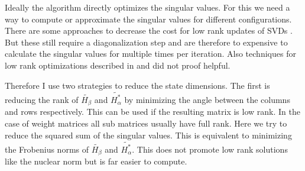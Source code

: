 \documentclass[doctype=mastersthesis,BCOR=15mm,biblatex]{ldvbook}%
\begin{document}
Ideally the algorithm directly optimizes the singular values.
For this we need a way to compute or approximate the singular values for different configurations. 
There are some approaches to decrease the cost for low rank updates of SVDs \cite{brand_fast_2006}.
But these still require a diagonalization step and are therefore to expensive to calculate the singular values for multiple times per iteration.
Also techniques for low rank optimizations described in \cite{liu_interior-point_2010} and \cite{recht_guaranteed_2010} did not proof helpful.

Therefore I use two strategies to reduce the state dimensions.
The first is reducing the rank of $\tilde{H_\beta}$ and $\tilde{H_\alpha^*}$ by minimizing the angle between the columns and rows respectively.
This can be used if the resulting matrix is low rank.
In the case of weight matrices all sub matrices usually have full rank.
Here we try to reduce the squared sum of the singular values.
This is equivalent to minimizing the Frobenius norms of $\tilde{H_\beta}$ and $\tilde{H_\alpha^*}$.
This does not promote low rank solutions like the nuclear norm but is far easier to compute.
\end{document}
